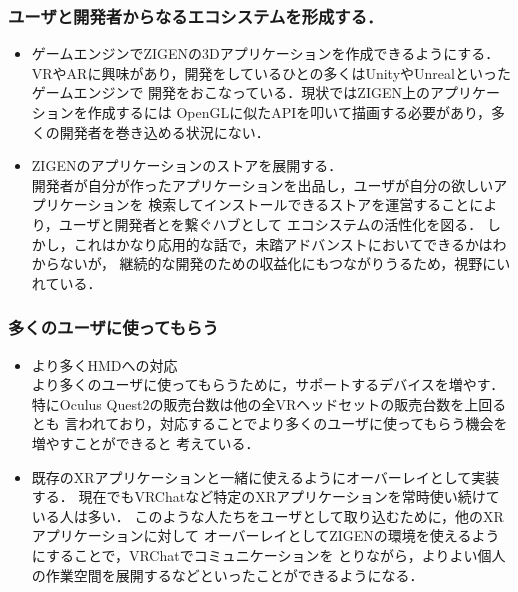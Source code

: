 \subsubsection*{ユーザと開発者からなるエコシステムを形成する．}

\begin{itemize}
  \item ゲームエンジンでZIGENの3Dアプリケーションを作成できるようにする．\\
        VRやARに興味があり，開発をしているひとの多くはUnityやUnrealといったゲームエンジンで
        開発をおこなっている．現状ではZIGEN上のアプリケーションを作成するには
        OpenGLに似たAPIを叩いて描画する必要があり，多くの開発者を巻き込める状況にない．

  \item ZIGENのアプリケーションのストアを展開する．\\
        開発者が自分が作ったアプリケーションを出品し，ユーザが自分の欲しいアプリケーションを
        検索してインストールできるストアを運営することにより，ユーザと開発者とを繋ぐハブとして
        エコシステムの活性化を図る．
        しかし，これはかなり応用的な話で，未踏アドバンストにおいてできるかはわからないが，
        継続的な開発のための収益化にもつながりうるため，視野にいれている．
\end{itemize}

\subsubsection*{多くのユーザに使ってもらう}

\begin{itemize}
  \item より多くHMDへの対応\\
        より多くのユーザに使ってもらうために，サポートするデバイスを増やす．
        特にOculus Quest2の販売台数は他の全VRヘッドセットの販売台数を上回るとも
        言われており，対応することでより多くのユーザに使ってもらう機会を増やすことができると
        考えている．

  \item 既存のXRアプリケーションと一緒に使えるようにオーバーレイとして実装する．
        現在でもVRChatなど特定のXRアプリケーションを常時使い続けている人は多い．
        このような人たちをユーザとして取り込むために，他のXRアプリケーションに対して
        オーバーレイとしてZIGENの環境を使えるようにすることで，VRChatでコミュニケーションを
        とりながら，よりよい個人の作業空間を展開するなどといったことができるようになる．
\end{itemize}

